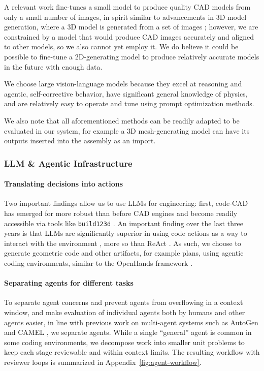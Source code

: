 \documentclass[conference]{IEEEtran}
\begin{document}
A relevant work \cite{ref39} fine-tunes a small model to produce quality CAD models from only a small number of images, in spirit similar to advancements in 3D model generation, where a 3D model is generated from a set of images \cite{ref38}; however, we are constrained by a model that would produce CAD images accurately and aligned to other models, so we also cannot yet employ it. We do believe it could be possible to fine-tune a 2D-generating model to produce relatively accurate models in the future with enough data.

We choose large vision-language models because they excel at reasoning and agentic, self-corrective behavior, have significant general knowledge of physics, and are relatively easy to operate and tune using prompt optimization methods.

We also note that all aforementioned methods can be readily adapted to be evaluated in our system, for example a 3D mesh-generating model can have its outputs inserted into the assembly as an import.

\subsubsection{LLM \& Agentic Infrastructure}
\paragraph{Translating decisions into actions}
Two important findings allow us to use LLMs for engineering: first, code-CAD has emerged for more robust than before CAD engines and become readily accessible via tools like \texttt{build123d} \cite{ref4}. An important finding over the last three years is that LLMs are significantly superior in using code actions as a way to interact with the environment \cite{ref23}, more so than ReAct \cite{ref16}. As such, we choose to generate geometric code and other artifacts, for example plans, using agentic coding environments, similar to the OpenHands framework \cite{ref9}.

\paragraph{Separating agents for different tasks}
To separate agent concerns and prevent agents from overflowing in a context window, and make evaluation of individual agents both by humans and other agents easier, in line with previous work on multi-agent systems such as AutoGen \cite{ref24} and CAMEL \cite{ref25}, we separate agents. While a single ``general'' agent is common in some coding environments, we decompose work into smaller unit problems to keep each stage reviewable and within context limits. The resulting workflow with reviewer loops is summarized in Appendix~\ref{fig:agent-workflow}.
\end{document}
